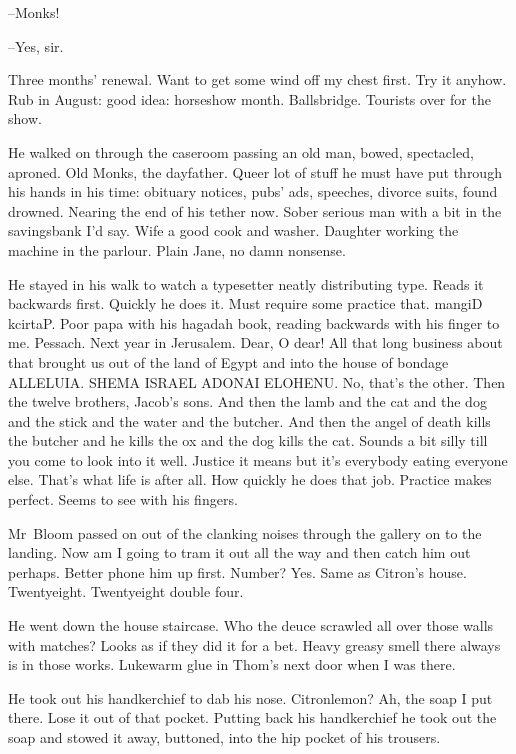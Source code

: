 --Monks!

--Yes, sir.

Three months' renewal.
Want to get some wind off my chest first.
Try it anyhow.
Rub in August:
good idea: horseshow month.
Ballsbridge.
Tourists over for the show.



He walked on through the caseroom
passing an old man, bowed, spectacled, aproned.
Old Monks, the dayfather.
Queer lot of stuff he must have put through his hands in his time:
obituary notices, pubs' ads, speeches, divorce suits, found drowned.
Nearing the end of his tether now.
Sober serious man with a bit in the savingsbank I'd say.
Wife a good cook and washer.
Daughter working the machine in the parlour.
Plain Jane, no damn nonsense.



He stayed in his walk to watch a typesetter
neatly distributing type.
Reads it backwards first.
Quickly he does it.
Must require some practice that.
mangiD kcirtaP.
Poor papa with his hagadah book,
reading backwards with his finger to me.
Pessach.
Next year in Jerusalem.
Dear, O dear!
All that long business about that brought us out of the land of Egypt
and into the house of bondage ALLELUIA.
SHEMA ISRAEL ADONAI ELOHENU.
No, that's the other.
Then the twelve brothers, Jacob's sons.
And then the lamb and the cat and the dog
and the stick and the water and the butcher.
And then the angel of death kills the butcher
and he kills the ox and the dog kills the cat.
Sounds a bit silly till you come to look into it well.
Justice it means but it's everybody eating everyone else.
That's what life is after all.
How quickly he does that job.
Practice makes perfect.
Seems to see with his fingers.

Mr~Bloom passed on out of the clanking noises
through the gallery on to the landing.
Now am I going to tram it out all the way and then catch him out perhaps.
Better phone him up first.
Number?
Yes.
Same as Citron's house.
Twentyeight.
Twentyeight double four.



He went down the house staircase.
Who the deuce scrawled all over those walls with matches?
Looks as if they did it for a bet.
Heavy greasy smell there always is in those works.
Lukewarm glue in Thom's next door when I was there.

He took out his handkerchief to dab his nose.
Citronlemon?
Ah, the soap I put there.
Lose it out of that pocket.
Putting back his handkerchief
he took out the soap and stowed it away,
buttoned,
into the hip pocket of his trousers.

